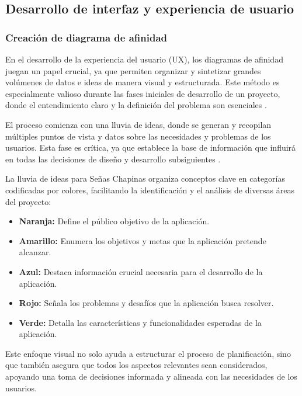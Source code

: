 \subsection{Desarrollo de interfaz y experiencia de usuario}

\subsubsection{Creación de diagrama de afinidad}

En el desarrollo de la experiencia del usuario (UX), los diagramas de afinidad juegan un papel crucial, ya que permiten organizar y sintetizar grandes volúmenes de datos e ideas de manera visual y estructurada. Este método es especialmente valioso durante las fases iniciales de desarrollo de un proyecto, donde el entendimiento claro y la definición del problema son esenciales \cite{Maze2024}.

El proceso comienza con una lluvia de ideas, donde se generan y recopilan múltiples puntos de vista y datos sobre las necesidades y problemas de los usuarios. Esta fase es crítica, ya que establece la base de información que influirá en todas las decisiones de diseño y desarrollo subsiguientes \cite{Maze2024}.

La lluvia de ideas para Señas Chapinas organiza conceptos clave en categorías codificadas por colores, facilitando la identificación y el análisis de diversas áreas del proyecto:

\begin{itemize}
    \item \textbf{Naranja:} Define el público objetivo de la aplicación.
    \item \textbf{Amarillo:} Enumera los objetivos y metas que la aplicación pretende alcanzar.
    \item \textbf{Azul:} Destaca información crucial necesaria para el desarrollo de la aplicación.
    \item \textbf{Rojo:} Señala los problemas y desafíos que la aplicación busca resolver.
    \item \textbf{Verde:} Detalla las características y funcionalidades esperadas de la aplicación.
\end{itemize}

Este enfoque visual no solo ayuda a estructurar el proceso de planificación, sino que también asegura que todos los aspectos relevantes sean considerados, apoyando una toma de decisiones informada y alineada con las necesidades de los usuarios.

